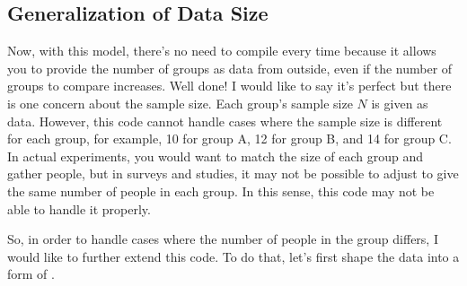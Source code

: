 \documentclass{ltjsbook}
\begin{document}




\subsection{Generalization of Data Size}
\label{tidyDataForm}
Now, with this model, there's no need to compile every time because it allows you to provide the number of groups as data from outside, even if the number of groups to compare increases. Well done!
I would like to say it's perfect but there is one concern about the sample size. Each group's sample size $N$ is given as data. However, this code cannot handle cases where the sample size is different for each group, for example, 10 for group A, 12 for group B, and 14 for group C. In actual experiments, you would want to match the size of each group and gather people, but in surveys and studies, it may not be possible to adjust to give the same number of people in each group. In this sense, this code may not be able to handle it properly.

So, in order to handle cases where the number of people in the group differs, I would like to further extend this code. To do that, let's first shape the data into a form of .
\end{document}

